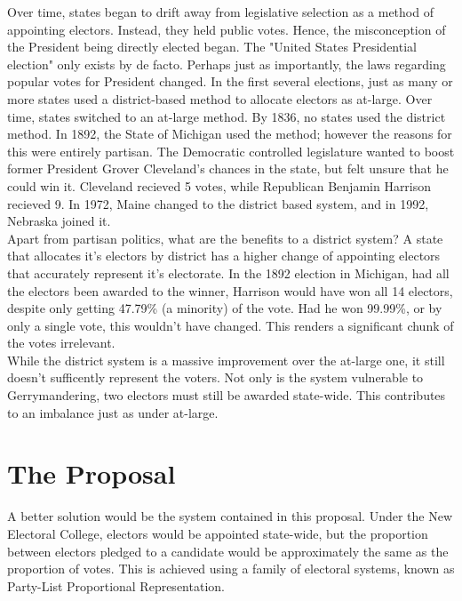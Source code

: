 \documentclass{article}
\begin{document}
    Over time, states began to drift away from legislative selection as a method of appointing electors. Instead, they held public votes. Hence, the misconception of the President being directly elected began. The "United States Presidential election" only exists by de facto. Perhaps just as importantly, the laws regarding popular votes for President changed. In the first several elections, just as many or more states used a district-based method to allocate electors as at-large. Over time, states switched to an at-large method. By 1836, no states used the district method. In 1892, the State of Michigan used the method; however the reasons for this were entirely partisan. The Democratic controlled legislature wanted to boost former President Grover Cleveland's chances in the state, but felt unsure that he could win it. Cleveland recieved 5 votes, while Republican Benjamin Harrison recieved 9. In 1972, Maine changed to the district based system, and in 1992, Nebraska joined it. \\

    Apart from partisan politics, what are the benefits to a district system? A state that allocates it's electors by district has a higher change of appointing electors that accurately represent it's electorate. In the 1892 election in Michigan, had all the electors been awarded to the winner, Harrison would have won all 14 electors, despite only getting 47.79\% (a minority) of the vote. Had he won 99.99\%, or by only a single vote, this wouldn't have changed. This renders a significant chunk of the votes irrelevant. \\

    While the district system is a massive improvement over the at-large one, it still doesn't sufficently represent the voters. Not only is the system vulnerable to Gerrymandering, two electors must still be awarded state-wide. This contributes to an imbalance just as under at-large. \\

    \section{The Proposal}%

    A better solution would be the system contained in this proposal. Under the New Electoral College, electors would be appointed state-wide, but the proportion between electors pledged to a candidate would be approximately the same as the proportion of votes. This is achieved using a family of electoral systems, known as Party-List Proportional Representation. \\
\end{document}

